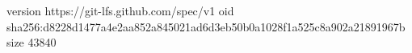 version https://git-lfs.github.com/spec/v1
oid sha256:d8228d1477a4e2aa852a845021ad6d3eb50b0a1028f1a525c8a902a21891967b
size 43840

